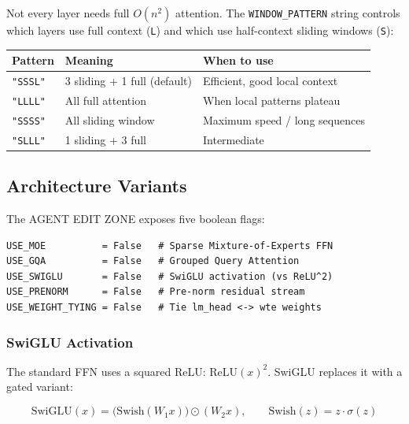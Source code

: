 \documentclass[12pt, a4paper]{article}
\newcommand{\code}[1]{\texttt{#1}}
\begin{document}
Not every layer needs full $O(n^2)$ attention. The \code{WINDOW\_PATTERN} string controls
which layers use full context (\code{L}) and which use half-context sliding windows (\code{S}):

\begin{center}
\begin{tabular}{@{}lll@{}}
\toprule
\textbf{Pattern} & \textbf{Meaning} & \textbf{When to use} \\
\midrule
\code{"SSSL"} & 3 sliding + 1 full (default) & Efficient, good local context \\
\code{"LLLL"} & All full attention & When local patterns plateau \\
\code{"SSSS"} & All sliding window & Maximum speed / long sequences \\
\code{"SLLL"} & 1 sliding + 3 full & Intermediate \\
\bottomrule
\end{tabular}
\end{center}

\subsection{Architecture Variants}

The AGENT EDIT ZONE exposes five boolean flags:

\begin{tcolorbox}[codebox, title=Architecture Variant Flags]
\begin{lstlisting}[style=pythonstyle]
USE_MOE          = False   # Sparse Mixture-of-Experts FFN
USE_GQA          = False   # Grouped Query Attention
USE_SWIGLU       = False   # SwiGLU activation (vs ReLU^2)
USE_PRENORM      = False   # Pre-norm residual stream
USE_WEIGHT_TYING = False   # Tie lm_head <-> wte weights
\end{lstlisting}
\end{tcolorbox}

\subsubsection{SwiGLU Activation}

The standard FFN uses a squared ReLU: $\text{ReLU}(x)^2$. SwiGLU replaces it with a gated
variant:

\begin{equation}
  \text{SwiGLU}(x) = \bigl(\text{Swish}(W_1 x)\bigr) \odot (W_2 x),
  \qquad \text{Swish}(z) = z \cdot \sigma(z)
\end{equation}
\end{document}
